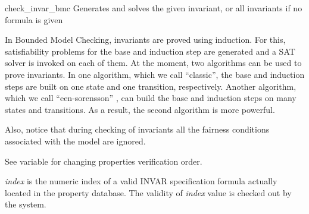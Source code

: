 \begin{nusmvCommand}{check\_invar\_bmc}{\label{checkInvarBmcCommand}
Generates and solves the given invariant, or all invariants if no
 formula is given}
 

In Bounded Model Checking, invariants are proved using induction. For
this, satisfiability problems for the base and induction step are
generated and a SAT solver is invoked on each of them. At the moment,
two algorithms can be used to prove invariants. In one algorithm,
which we call ``classic'', the base and induction steps are built on
one state and one transition, respectively.  Another algorithm, which
we call ``een-sorensson'' \cite{een04temporal}, can build the base and
induction steps on many states and transitions. As a result, the
second algorithm is more powerful.

Also, notice that during checking of invariants all the fairness
conditions associated with the model are ignored.

See variable  for changing properties
verification order.
\begin{cmdOpt}

 { {\it index} is the numeric
index of a valid INVAR specification formula actually located in the
property database.  The validity of {\it index} value is checked out
by the system.}
       

            



\end{cmdOpt}
\end{nusmvCommand}
